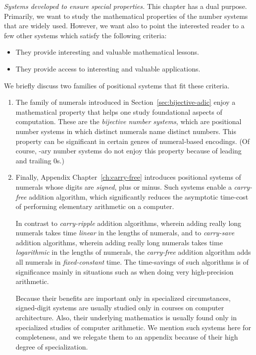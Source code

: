 \noindent
{\it Systems developed to ensure special properties.}
This chapter has a dual purpose.  Primarily, we want to study the mathematical properties of the number systems that are widely used.  However, we want also to point the interested reader to a few other systems which satisfy the following criteria:
\begin{itemize}
\item
They provide interesting and valuable mathematical lessons.
\item
They provide access to interesting and valuable applications.
\end{itemize}
We briefly discuss two families of positional systems that fit these criteria. 
\begin{enumerate}
\item
The family of numerals introduced in Section~\ref{sec:bijective-adic} enjoy a mathematical property that helps one study foundational aspects of computation.  These are the {\em bijective number systems},  which are positional number systems in which distinct numerals name distinct numbers.  This property can be significant in certain genres of numeral-based encodings.  (Of course, -ary number systems do not enjoy this property because of leading and trailing $0$s.)

\medskip\item
Finally, Appendix Chapter~\ref{ch:carry-free} introduces positional systems of 
numerals whose digits are {\em signed}, plus or minus.  Such systems enable a {\em carry-free} addition algorithm, which significantly reduces the asymptotic time-cost of performing elementary arithmetic on a computer.  

\smallskip

In contrast to {\em carry-ripple} addition algorithms, wherein adding really long numerals takes time {\em linear} in the lengths of numerals, and to {\em carry-save} addition algorithms, wherein adding really long numerals takes time {\em logarithmic} in the lengths of numerals, the {\em carry-free} addition algorithm adds all numerals in {\em fixed-constant} time.  The time-savings of such algorithms is of significance mainly in situations such as when doing very high-precision arithmetic.

\smallskip

Because their benefits are important only in specialized circumstances, signed-digit systems are usually studied only in courses on computer architecture.  Also, their underlying mathematics is usually found only in specialized studies of computer arithmetic.  We mention such systems here for completeness, and we relegate them to an appendix because of their high degree of specialization.
\end{enumerate}

